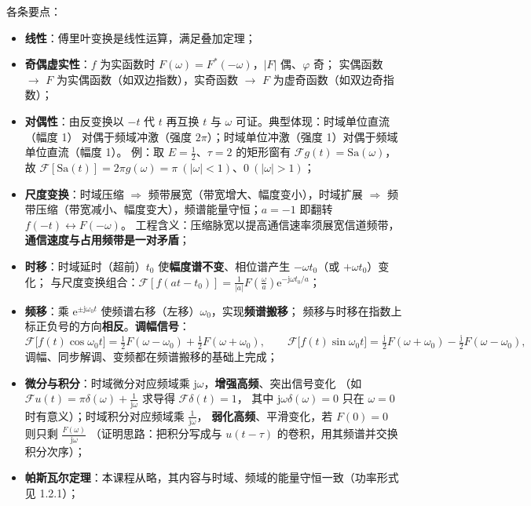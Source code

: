 各条要点：
\begin{itemize}
\item \textbf{线性}：傅里叶变换是线性运算，满足叠加定理；
\item \textbf{奇偶虚实性}：$f$ 为实函数时 $F(\omega)=F^{*}(-\omega)$，$|F|$ 偶、$\varphi$ 奇；
  实偶函数 $\to$ $F$ 为实偶函数（如双边指数），实奇函数 $\to$ $F$ 为虚奇函数（如双边奇指数）；
\item \textbf{对偶性}：由反变换以 $-t$ 代 $t$ 再互换 $t$ 与 $\omega$ 可证。典型体现：时域单位直流（幅度 1）
  对偶于频域冲激（强度 $2\pi$）；时域单位冲激（强度 1）对偶于频域单位直流（幅度 1）。
  例：取 $E=\frac12$、$\tau=2$ 的矩形窗有 $\mathcal{F}g(t)=\mathrm{Sa}(\omega)$，故
  $\mathcal{F}[\mathrm{Sa}(t)]=2\pi g(\omega)=\pi\ (|\omega|<1)$、$0\ (|\omega|>1)$；
\item \textbf{尺度变换}：时域压缩 $\Rightarrow$ 频带展宽（带宽增大、幅度变小），时域扩展 $\Rightarrow$
  频带压缩（带宽减小、幅度变大），频谱能量守恒；$a=-1$ 即翻转 $f(-t)\leftrightarrow F(-\omega)$。
  工程含义：压缩脉宽以提高通信速率须展宽信道频带，\textbf{通信速度与占用频带是一对矛盾}；
\item \textbf{时移}：时域延时（超前）$t_0$ 使\textbf{幅度谱不变}、相位谱产生 $-\omega t_0$（或 $+\omega t_0$）变化；
  与尺度变换组合：$\mathcal{F}[f(at-t_0)]=\frac{1}{|a|}F(\frac{\omega}{a})\mathrm{e}^{-\mathrm{j}\omega t_0/a}$；
\item \textbf{频移}：乘 $\mathrm{e}^{\pm\mathrm{j}\omega_0t}$ 使频谱右移（左移）$\omega_0$，实现\textbf{频谱搬移}；
  频移与时移在指数上标正负号的方向\textbf{相反}。\textbf{调幅信号}：
  \begin{equation}
  \mathcal{F}\big[f(t)\cos\omega_0t\big]=\tfrac12F(\omega-\omega_0)+\tfrac12F(\omega+\omega_0),\qquad
  \mathcal{F}\big[f(t)\sin\omega_0t\big]=\tfrac{\mathrm{j}}{2}F(\omega+\omega_0)-\tfrac{\mathrm{j}}{2}F(\omega-\omega_0),
  \end{equation}
  调幅、同步解调、变频都在频谱搬移的基础上完成；
\item \textbf{微分与积分}：时域微分对应频域乘 $\mathrm{j}\omega$，\textbf{增强高频}、突出信号变化
  （如 $\mathcal{F}u(t)=\pi\delta(\omega)+\frac{1}{\mathrm{j}\omega}$ 求导得 $\mathcal{F}\delta(t)=1$，
  其中 $\mathrm{j}\omega\delta(\omega)=0$ 只在 $\omega=0$ 时有意义）；时域积分对应频域乘 $\frac{1}{\mathrm{j}\omega}$，
  \textbf{弱化高频}、平滑变化，若 $F(0)=0$ 则只剩 $\frac{F(\omega)}{\mathrm{j}\omega}$
  （证明思路：把积分写成与 $u(t-\tau)$ 的卷积，用其频谱并交换积分次序）；
\item \textbf{帕斯瓦尔定理}：本课程从略，其内容与时域、频域的能量守恒一致（功率形式见 1.2.1）；

\end{itemize}
